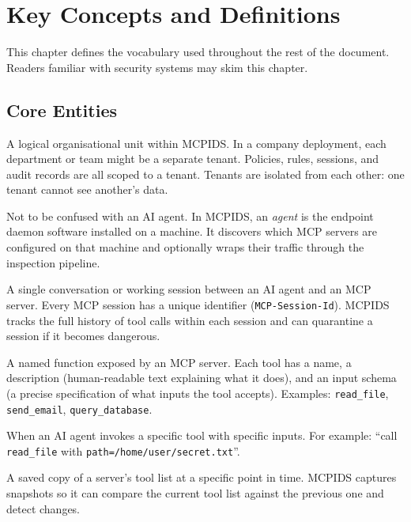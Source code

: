 \documentclass[12pt,a4paper]{report}
\begin{document}
\chapter{Key Concepts and Definitions}

This chapter defines the vocabulary used throughout the rest of the document.
Readers familiar with security systems may skim this chapter.

\section{Core Entities}

\begin{description}[leftmargin=0pt]

  \item[\textbf{Tenant.}] A logical organisational unit within MCPIDS. In a
    company deployment, each department or team might be a separate tenant.
    Policies, rules, sessions, and audit records are all scoped to a tenant.
    Tenants are isolated from each other: one tenant cannot see another's data.

  \item[\textbf{Agent (MCPIDS).}] Not to be confused with an AI agent.
    In MCPIDS, an \textit{agent} is the endpoint daemon software installed on
    a machine. It discovers which MCP servers are configured on that machine
    and optionally wraps their traffic through the inspection pipeline.

  \item[\textbf{Session.}] A single conversation or working session between an
    AI agent and an MCP server. Every MCP session has a unique identifier
    (\texttt{MCP-Session-Id}). MCPIDS tracks the full history of tool calls
    within each session and can quarantine a session if it becomes dangerous.

  \item[\textbf{Tool.}] A named function exposed by an MCP server. Each tool
    has a name, a description (human-readable text explaining what it does),
    and an input schema (a precise specification of what inputs the tool
    accepts). Examples: \texttt{read\_file}, \texttt{send\_email},
    \texttt{query\_database}.

  \item[\textbf{Tool Call.}] When an AI agent invokes a specific tool with
    specific inputs. For example: ``call \texttt{read\_file} with
    \texttt{path=/home/user/secret.txt}''.

  \item[\textbf{Snapshot.}] A saved copy of a server's tool list at a
    specific point in time. MCPIDS captures snapshots so it can compare the
    current tool list against the previous one and detect changes.

\end{description}
\end{document}
